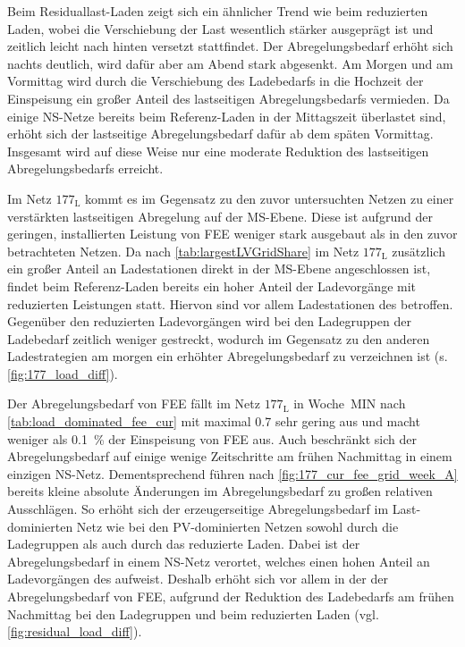 Beim Residuallast-Laden zeigt sich ein ähnlicher Trend wie beim reduzierten Laden, wobei die Verschiebung der Last wesentlich stärker ausgeprägt ist und zeitlich leicht nach hinten versetzt stattfindet.
Der Abregelungsbedarf erhöht sich nachts deutlich, wird dafür aber am Abend stark abgesenkt.
Am Morgen und am Vormittag wird durch die Verschiebung des Ladebedarfs in die Hochzeit der Einspeisung ein großer Anteil des lastseitigen Abregelungsbedarfs vermieden.
Da einige \gls{NS}-Netze bereits beim Referenz-Laden in der Mittagszeit überlastet sind, erhöht sich der lastseitige Abregelungsbedarf dafür ab dem späten Vormittag.
Insgesamt wird auf diese Weise nur eine moderate Reduktion des lastseitigen Abregelungsbedarfs erreicht.



Im Netz \(177_{\text{L}}\) kommt es im Gegensatz zu den zuvor untersuchten Netzen zu einer verstärkten lastseitigen Abregelung auf der \gls{MS}-Ebene.
Diese ist aufgrund der geringen, installierten Leistung von \gls{FEE} weniger stark ausgebaut als in den zuvor betrachteten Netzen.
Da nach \autoref{tab:largestLVGridShare} im Netz \(177_{\text{L}}\) zusätzlich ein großer Anteil an Ladestationen direkt in der \gls{MS}-Ebene angeschlossen ist, findet beim Referenz-Laden bereits ein hoher Anteil der Ladevorgänge mit reduzierten Leistungen statt.
Hiervon sind vor allem Ladestationen des \UC \Firmeparkplatz betroffen.
Gegenüber den reduzierten Ladevorgängen wird bei den Ladegruppen der Ladebedarf zeitlich weniger gestreckt, wodurch im Gegensatz zu den anderen Ladestrategien am morgen ein erhöhter Abregelungsbedarf zu verzeichnen ist (s. \autoref{fig:177_load_diff}).



Der Abregelungsbedarf von \gls{FEE} fällt im Netz \(177_{\text{L}}\) in Woche~MIN nach \autoref{tab:load_dominated_fee_cur} mit maximal \SI{0.7}{\mwh} sehr gering aus und macht weniger als \SI{0.1}{\percent} der Einspeisung von \gls{FEE} aus.
Auch beschränkt sich der Abregelungsbedarf auf einige wenige Zeitschritte am frühen Nachmittag in einem einzigen \gls{NS}-Netz.
Dementsprechend führen nach \autoref{fig:177_cur_fee_grid_week_A} bereits kleine absolute Änderungen im Abregelungsbedarf zu großen relativen Ausschlägen.
So erhöht sich der erzeugerseitige Abregelungsbedarf im Last-dominierten Netz wie bei den \gls{PV}-dominierten Netzen sowohl durch die Ladegruppen als auch durch das reduzierte Laden.
Dabei ist der Abregelungsbedarf in einem \gls{NS}-Netz verortet, welches einen hohen Anteil an Ladevorgängen des \UC \zH aufweist.
Deshalb erhöht sich vor allem in der \SzeFirmenparkplatz der Abregelungsbedarf von \gls{FEE}, aufgrund der Reduktion des Ladebedarfs am frühen Nachmittag bei den Ladegruppen und beim reduzierten Laden (vgl. \autoref{fig:residual_load_diff}).

